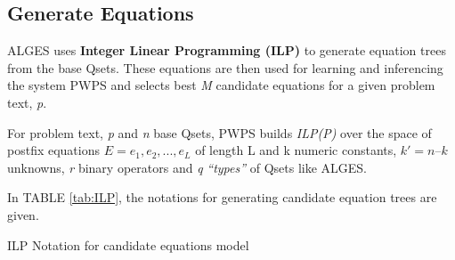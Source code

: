 \documentclass[document.tex]{subfiles}
\begin{document}
\subsection{Generate Equations}
ALGES uses \textbf{Integer Linear Programming (ILP)} to generate equation trees from the base Qsets. These equations are then used for learning and inferencing the system PWPS and selects best \textit{M} candidate equations for a given problem text, \textit{p}.

For problem text, \textit{p} and \textit{n} base Qsets, PWPS builds \textit{ILP(P)} over the space of postfix equations $ E = e_1, e_2,...,e_L $ of length L  and k numeric constants, $k'  = n – k$ unknowns, \textit{r} binary operators and \textit{q} \textit{“types”} of Qsets like ALGES.


In TABLE \ref{tab:ILP}, the notations for generating candidate equation trees are given.
\begin{table}[H]
	\caption{ILP Notation for candidate equations model \cite{3}}
	\begin{center}
\end{center}
	\label{tab:ILP}
\end{table}
\end{document}

